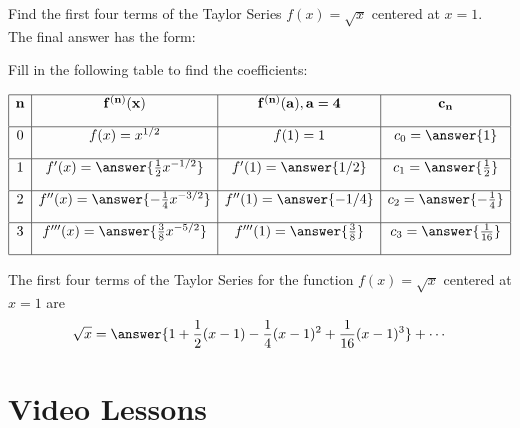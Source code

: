 \documentclass{ximera}
\begin{document}
\begin{problem} Find the first four terms of the Taylor Series $f(x) = \sqrt x$ centered at $x = 1$.\\

The final answer has the form:
\begin{multipleChoice}
\end{multipleChoice}


Fill in the following table to find the coefficients:

\[
\begin{array}{|c|c|c|c|} 
\hline
\bf{n} & \bf{f^{(n)}(x)} & \bf{f^{(n)}(a), a = 4} & \bf{c_n} \\[1em] 
\hline
 0 & f(x) = x^{1/2} & f(1) = 1 & c_0 = \answer{1} \\[1em]
\hline
1 & f'(x) = \answer{\frac12 x^{-1/2}} & f'(1) = \answer{1/2} & c_1 = \answer{\frac12} \\[1em]
\hline
 2 & f''(x) =\answer{-\frac14 x^{-3/2}} & f''(1) = \answer{-1/4} & c_2 = \answer{-\frac{1}{4}} \\[1em]
\hline
 3 & f'''(x) =\answer{\frac38 x^{-5/2}} & f'''(1) = \answer{\frac38 } & c_3 = \answer{\frac{1}{16}}\\[1em]
\hline
\end{array}
\]


The first four terms of the Taylor Series for the function $f(x) = \sqrt x$ centered at $x = 1$ are
\[
\sqrt x = \answer{1 + \frac12(x-1) -\frac{1}{4}(x-1)^2 + \frac{1}{16}(x-1)^3} + \cdots
\]


\end{problem}


\section{Video Lessons}

\begin{center}
\begin{foldable}
\end{foldable}
\end{center}



\begin{center}
\begin{foldable}
\end{foldable}
\end{center}
\end{document}
